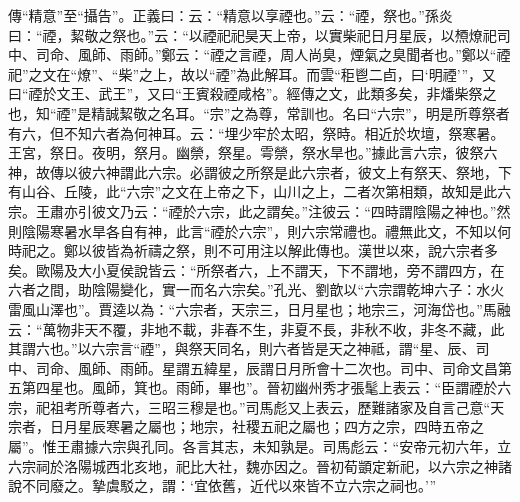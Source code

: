 {\noindent\zhuan{}\fzbyks 傳“精意”至“攝告”。正義曰：云：“精意以享禋也。”云：“禋，祭也。”孫炎曰：“禋，絜敬之祭也。”云：“以禋祀祀昊天上帝，以實柴祀日月星辰，以槱燎祀司中、司命、風師、雨師。”鄭云：“禋之言禋，周人尚臭，煙氣之臭聞者也。”鄭以“禋祀”之文在“燎”、“柴”之上，故以“禋”為此解耳。而雲“秬鬯二卣，曰‘明禋’”，又曰“禋於文王、武王”，又曰“王賓殺禋咸格”。經傳之文，此類多矣，非燔柴祭之也，知“禋”是精誠絜敬之名耳。“宗”之為尊，常訓也。名曰“六宗”，明是所尊祭者有六，但不知六者為何神耳。云：“埋少牢於太昭，祭時。相近於坎壇，祭寒暑。王宮，祭日。夜明，祭月。幽禜，祭星。雩禜，祭水旱也。”據此言六宗，彼祭六神，故傳以彼六神謂此六宗。必謂彼之所祭是此六宗者，彼文上有祭天、祭地，下有山谷、丘陵，此“六宗”之文在上帝之下，山川之上，二者次第相類，故知是此六宗。王肅亦引彼文乃云：“禋於六宗，此之謂矣。”注彼云：“四時謂陰陽之神也。”然則陰陽寒暑水旱各自有神，此言“禋於六宗”，則六宗常禮也。禮無此文，不知以何時祀之。鄭以彼皆為祈禱之祭，則不可用注以解此傳也。漢世以來，說六宗者多矣。歐陽及大小夏侯說皆云：“所祭者六，上不謂天，下不謂地，旁不謂四方，在六者之間，助陰陽變化，實一而名六宗矣。”孔光、劉歆以“六宗謂乾坤六子：水火雷風山澤也”。賈逵以為：“六宗者，天宗三，日月星也；地宗三，河海岱也。”馬融云：“萬物非天不覆，非地不載，非春不生，非夏不長，非秋不收，非冬不藏，此其謂六也。”以六宗言“禋”，與祭天同名，則六者皆是天之神祗，謂“星、辰、司中、司命、風師、雨師。星謂五緯星，辰謂日月所會十二次也。司中、司命文昌第五第四星也。風師，箕也。雨師，畢也”。晉初幽州秀才張髦上表云：“臣謂禋於六宗，祀祖考所尊者六，三昭三穆是也。”司馬彪又上表云，歷難諸家及自言己意“天宗者，日月星辰寒暑之屬也；地宗，社稷五祀之屬也；四方之宗，四時五帝之屬”。惟王肅據六宗與孔同。各言其志，未知孰是。司馬彪云：“安帝元初六年，立六宗祠於洛陽城西北亥地，祀比大社，魏亦因之。晉初荀顗定新祀，以六宗之神諸說不同廢之。摯虞駁之，謂：‘宜依舊，近代以來皆不立六宗之祠也。’” \par}

